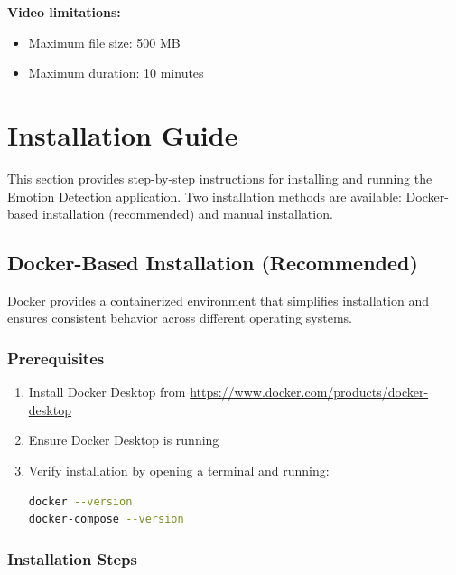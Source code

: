 \textbf{Video limitations:}
\begin{itemize}
    \item Maximum file size: 500 MB
    \item Maximum duration: 10 minutes
\end{itemize}

\section{Installation Guide}
\label{sec:installation-guide}

This section provides step-by-step instructions for installing and running the Emotion Detection application. Two installation methods are available: Docker-based installation (recommended) and manual installation.

\subsection{Docker-Based Installation (Recommended)}

Docker provides a containerized environment that simplifies installation and ensures consistent behavior across different operating systems.

\subsubsection{Prerequisites}

\begin{enumerate}
    \item Install Docker Desktop from \url{https://www.docker.com/products/docker-desktop}
    \item Ensure Docker Desktop is running
    \item Verify installation by opening a terminal and running:
\begin{lstlisting}[language=bash, caption={Verify Docker installation}]
docker --version
docker-compose --version
\end{lstlisting}
\end{enumerate}

\subsubsection{Installation Steps}

